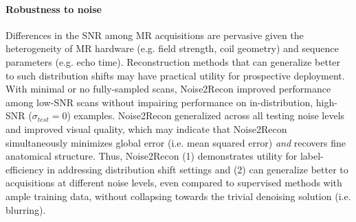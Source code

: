 \documentclass[10pt,twocolumn,letterpaper]{article}
\newcommand{\testnoise}{\sigma_{test}}
\newcommand{\RV}[1]{{#1}}
\begin{document}
\paragraph{Robustness to noise} Differences in the SNR among MR acquisitions are pervasive given the heterogeneity of MR hardware (e.g. field strength, coil geometry) and sequence parameters (e.g. echo time). Reconstruction methods that can generalize better to such distribution shifts may have practical utility for prospective deployment. \RV{With minimal or no fully-sampled scans, Noise2Recon improved performance among low-SNR scans without impairing performance on in-distribution, high-SNR ($\testnoise=0$) examples.} Noise2Recon generalized across all testing noise levels and improved visual quality, which may indicate that Noise2Recon simultaneously minimizes global error (i.e. mean squared error) \textit{and} recovers fine anatomical structure.  Thus, Noise2Recon (1) demonstrates utility for label-efficiency in addressing distribution shift settings and (2) can generalize better to acquisitions at different noise levels, even compared to supervised methods with ample training data, without collapsing towards the trivial denoising solution (i.e. blurring).


\end{document}
